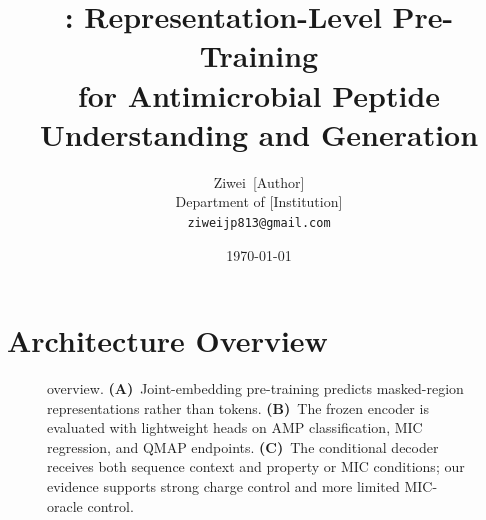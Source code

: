 \documentclass[11pt,a4paper]{article}
\title{\textbf{\projectname{}: Representation-Level Pre-Training\\
for Antimicrobial Peptide Understanding and Generation}}
\author{Ziwei~[Author]\\
\small Department of [Institution]\\
\small \texttt{ziweijp813@gmail.com}}
\date{\today}
\begin{document}
\maketitle









\section{Architecture Overview}
\label{sec:arch_fig}

\begin{figure}[h]
\centering
\resizebox{\textwidth}{!}{}
\caption{\projectname{} overview.
\textbf{(A)}~Joint-embedding pre-training predicts masked-region representations
rather than tokens.
\textbf{(B)}~The frozen encoder is evaluated with lightweight heads on AMP
classification, MIC regression, and QMAP endpoints.
\textbf{(C)}~The conditional decoder receives both sequence context and property
or MIC conditions; our evidence supports strong charge control and more limited
MIC-oracle control.}
\label{fig:arch}
\end{figure}






\end{document}
